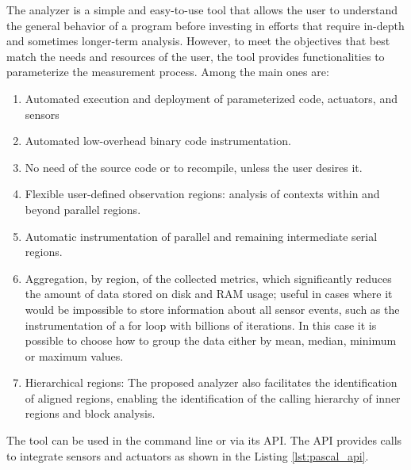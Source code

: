 The analyzer is a simple and easy-to-use tool that allows the user to understand the general behavior of a program before investing in efforts that require in-depth and sometimes longer-term analysis. However, to meet the objectives that best match the needs and resources of the user, the tool provides functionalities to parameterize the measurement process. Among the main ones are:
\begin{enumerate}
	\item Automated execution and deployment of parameterized code, actuators, and sensors
	\item Automated low-overhead binary code instrumentation.
	\item No need of the source code or to recompile, unless the user desires it. 
	\item Flexible user-defined observation regions: analysis of contexts within and beyond parallel regions.
	\item Automatic instrumentation of parallel and remaining intermediate serial regions.
	\item Aggregation, by region, of the collected metrics, which significantly reduces the amount of data stored on disk and RAM usage; useful in cases where it would be impossible to store information about all sensor events, such as the instrumentation of a for loop with billions of iterations. In this case it is possible to choose how to group the data either by mean, median, minimum or maximum values.
	\item Hierarchical regions: The proposed analyzer also facilitates the identification of aligned regions, enabling the identification of the calling hierarchy of inner regions and block analysis.
\end{enumerate}
\newpage
The tool can be used in the command line or via its API. The API provides calls to integrate sensors and actuators as shown in the Listing \ref{lst:pascal_api}.


